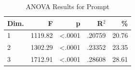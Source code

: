 \begin{table}[H]
  \centering
  \caption{ANOVA Results for Prompt}
  \label{tab:anova_prompt}
  \begin{tabular}{l r r r r}
    Dim. & F & p & R$^2$ & \% \\
    \hline
    1 & 1119.82 & <.0001 & .20759 & 20.76 \\
    2 & 1302.29 & <.0001 & .23352 & 23.35 \\
    3 & 1712.91 & <.0001 & .28608 & 28.61 \\
  \end{tabular}
\end{table}
